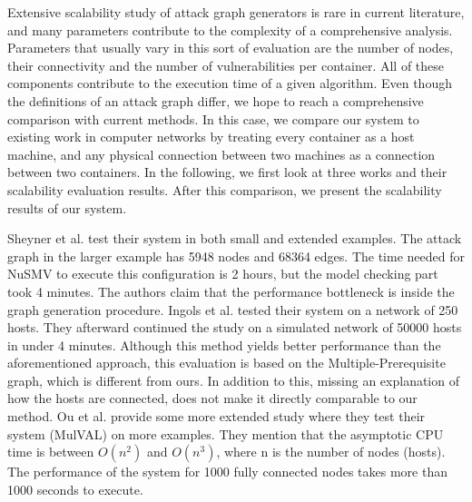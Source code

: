 Extensive scalability study of attack graph generators is rare in current literature, and many parameters contribute to the complexity of a comprehensive analysis. Parameters that usually vary in this sort of evaluation are the number of nodes, their connectivity and the number of vulnerabilities per container. All of these components contribute to the execution time of a given algorithm. Even though the definitions of an attack graph differ, we hope to reach a comprehensive comparison with current methods. In this case, we compare our system to existing work in computer networks by treating every container as a host machine, and any physical connection between two machines as a connection between two containers. In the following, we first look at three works and their scalability evaluation results. After this comparison, we present the scalability results of our system.

Sheyner et al. \cite{sheyner2002automated} test their system in both small and extended examples. The attack graph in the larger example has 5948 nodes and 68364 edges. The time needed for NuSMV to execute this configuration is 2 hours, but the model checking part took 4 minutes. The authors claim that the performance bottleneck is inside the graph generation procedure. Ingols et al. \cite{ingols2006practical} tested their system on a network of 250 hosts. They afterward continued the study on a simulated network of 50000 hosts in under 4 minutes. Although this method yields better performance than the aforementioned approach, this evaluation is based on the Multiple-Prerequisite graph, which is different from ours. In addition to this, missing an explanation of how the hosts are connected, does not make it directly comparable to our method. Ou et al. \cite{ou2006scalable} provide some more extended study where they test their system (MulVAL) on more examples. They mention that the asymptotic CPU time is between $O(n^2)$ and $O(n^3)$, where n is the number of nodes (hosts). The performance of the system for 1000 fully connected nodes takes more than 1000 seconds to execute. %

